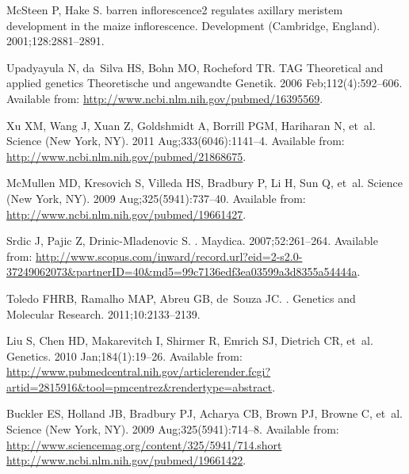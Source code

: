 \documentclass[10pt,letterpaper]{article}
\begin{document}
\begin{thebibliography}{10}
McSteen P, Hake S.
\newblock barren inflorescence2 regulates axillary meristem development in the
  maize inflorescence.
\newblock Development (Cambridge, England). 2001;128:2881--2891.

Upadyayula N, da~Silva HS, Bohn MO, Rocheford TR.
\newblock TAG Theoretical and applied genetics Theoretische und angewandte
  Genetik. 2006 Feb;112(4):592--606.
\newblock Available from: \url{http://www.ncbi.nlm.nih.gov/pubmed/16395569}.

Xu XM, Wang J, Xuan Z, Goldshmidt A, Borrill PGM, Hariharan N, et~al.
\newblock Science (New York, NY). 2011 Aug;333(6046):1141--4.
\newblock Available from: \url{http://www.ncbi.nlm.nih.gov/pubmed/21868675}.

McMullen MD, Kresovich S, Villeda HS, Bradbury P, Li H, Sun Q, et~al.
\newblock Science (New York, NY). 2009 Aug;325(5941):737--40.
\newblock Available from: \url{http://www.ncbi.nlm.nih.gov/pubmed/19661427}.

Srdic J, Pajic Z, Drinic-Mladenovic S.
.
\newblock Maydica. 2007;52:261--264.
\newblock Available from:
  \url{http://www.scopus.com/inward/record.url?eid=2-s2.0-37249062073\&partnerID=40\&md5=99c7136edf3ea03599a3d8355a54444a}.

Toledo FHRB, Ramalho MAP, Abreu GB, de~Souza JC.
.
\newblock Genetics and Molecular Research. 2011;10:2133--2139.

Liu S, Chen HD, Makarevitch I, Shirmer R, Emrich SJ, Dietrich CR, et~al.
\newblock Genetics. 2010 Jan;184(1):19--26.
\newblock Available from:
  \url{http://www.pubmedcentral.nih.gov/articlerender.fcgi?artid=2815916\&tool=pmcentrez\&rendertype=abstract}.

Buckler ES, Holland JB, Bradbury PJ, Acharya CB, Brown PJ, Browne C, et~al.
\newblock Science (New York, NY). 2009 Aug;325(5941):714--8.
\newblock Available from:
  \url{http://www.sciencemag.org/content/325/5941/714.short
  http://www.ncbi.nlm.nih.gov/pubmed/19661422}.


\end{thebibliography}
\end{document}
